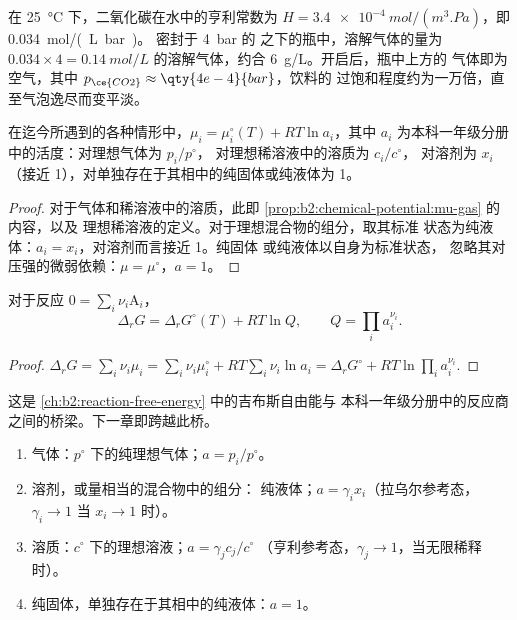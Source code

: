 \begin{example}[二氧化碳在汽水中]\label{ex:b2:chemical-potential:soda}
在 \qty{25}{\celsius} 下，二氧化碳在水中的亨利常数为 $H =
\qty{3.4e-4}{mol/(m^3.Pa)}$，即 \qty{0.034}{mol/(L.bar)}。
密封于 \qty{4}{bar} 的  之下的瓶中，溶解气体的量为 $0.034 \times 4 =
\qty{0.14}{mol/L}$ 的溶解气体，约合 \qty{6}{g/L}。开启后，瓶中上方的
气体即为空气，其中 $p_{\ce{CO2}} \approx \qty{4e-4}{bar}$，饮料的
过饱和程度约为一万倍，直至气泡逸尽而变平淡。
\end{example}

\begin{proposition}[由化学势求活度]\label{prop:b2:chemical-potential:activity}
在迄今所遇到的各种情形中，$\mu_i = \mu_i^\circ(T) + RT\ln a_i$，其中 $a_i$
为本科一年级分册中的活度：对理想气体为 $p_i/p^\circ$，
对理想稀溶液中的溶质为 $c_i/c^\circ$，
对溶剂为 $x_i$（接近 1），对单独存在于其相中的纯固体或纯液体为 1。
\end{proposition}

\begin{proof}
对于气体和稀溶液中的溶质，此即
\cref{prop:b2:chemical-potential:mu-gas} 的内容，以及
理想稀溶液的定义。对于理想混合物的组分，取其标准
状态为纯液体：$a_i = x_i$，对溶剂而言接近 1。纯固体
或纯液体以自身为标准状态，
忽略其对压强的微弱依赖：$\mu = \mu^\circ$，$a = 1$。
\end{proof}

\begin{proposition}[反应吉布斯自由能与反应商]\label{prop:b2:chemical-potential:delta-g-q}
对于反应 $0 = \sum_i\nu_i\mathrm A_i$，
\[
  \Delta_r G = \Delta_r G^\circ(T) + RT\ln Q, \qquad Q = \prod_i a_i^{\nu_i} .
\]
\end{proposition}

\begin{proof}
$\Delta_r G = \sum_i\nu_i\mu_i = \sum_i\nu_i\mu_i^\circ + RT\sum_i\nu_i\ln a_i =
\Delta_r G^\circ + RT\ln\prod_i a_i^{\nu_i}$.
\end{proof}

这是 \cref{ch:b2:reaction-free-energy} 中的吉布斯自由能与
本科一年级分册中的反应商之间的桥梁。下一章即跨越此桥。

\begin{method}[选取活度的参考态]\label{met:b2:chemical-potential:activity-reference}
\begin{enumerate}
  \item 气体：$p^\circ$ 下的纯理想气体；$a = p_i/p^\circ$。
  \item 溶剂，或量相当的混合物中的组分：
        纯液体；$a = \gamma_i x_i$（拉乌尔参考态，$\gamma_i \to 1$
        当 $x_i \to 1$ 时）。
  \item 溶质：$c^\circ$ 下的理想溶液；$a = \gamma_j c_j/c^\circ$
        （亨利参考态，$\gamma_j \to 1$，当无限稀释时）。
  \item 纯固体，单独存在于其相中的纯液体：$a = 1$。
\end{enumerate}
\end{method}

